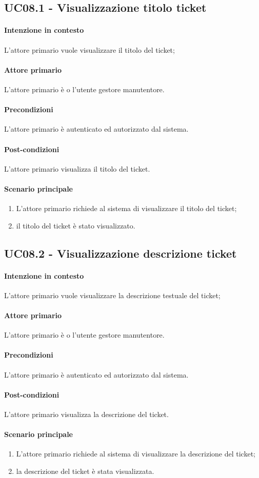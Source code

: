 \subsection{UC08.1 - Visualizzazione titolo ticket}\label{uc:08.1}

\paragraph{Intenzione in contesto} L'attore primario vuole visualizzare il titolo del ticket;
\paragraph{Attore primario} L'attore primario è o l'utente gestore manutentore.
\paragraph{Precondizioni} L'attore primario è autenticato ed autorizzato dal sistema.
\paragraph{Post-condizioni} L'attore primario visualizza il titolo del ticket.
\paragraph{Scenario principale}
\begin{enumerate}
    \item L'attore primario richiede al sistema di visualizzare il titolo del ticket;
    \item il titolo del ticket è stato visualizzato.
\end{enumerate}

\subsection{UC08.2 - Visualizzazione descrizione ticket}\label{uc:08.2}

\paragraph{Intenzione in contesto} L'attore primario vuole visualizzare la descrizione testuale del ticket;
\paragraph{Attore primario} L'attore primario è o l'utente gestore manutentore.
\paragraph{Precondizioni} L'attore primario è autenticato ed autorizzato dal sistema.
\paragraph{Post-condizioni} L'attore primario visualizza la descrizione del ticket.
\paragraph{Scenario principale}
\begin{enumerate}
    \item L'attore primario richiede al sistema di visualizzare la descrizione del ticket;
    \item la descrizione del ticket è stata visualizzata.
\end{enumerate}